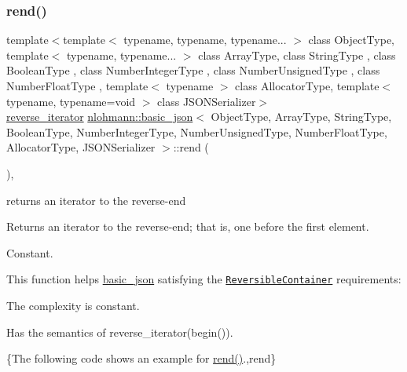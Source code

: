 \subsubsection{\texorpdfstring{rend()}{rend()}\hspace{0.1cm}{\footnotesize\ttfamily [1/2]}}
{\footnotesize\ttfamily template$<$template$<$ typename, typename, typename... $>$ class Object\+Type, template$<$ typename, typename... $>$ class Array\+Type, class String\+Type , class Boolean\+Type , class Number\+Integer\+Type , class Number\+Unsigned\+Type , class Number\+Float\+Type , template$<$ typename $>$ class Allocator\+Type, template$<$ typename, typename=void $>$ class J\+S\+O\+N\+Serializer$>$ \\
\hyperlink{classnlohmann_1_1basic__json_ac223d5560c2b05a208c88de67376c5f2}{reverse\+\_\+iterator} \hyperlink{classnlohmann_1_1basic__json}{nlohmann\+::basic\+\_\+json}$<$ Object\+Type, Array\+Type, String\+Type, Boolean\+Type, Number\+Integer\+Type, Number\+Unsigned\+Type, Number\+Float\+Type, Allocator\+Type, J\+S\+O\+N\+Serializer $>$\+::rend (\begin{DoxyParamCaption}{ }\end{DoxyParamCaption})\hspace{0.3cm}{\ttfamily [inline]}, {\ttfamily [noexcept]}}



returns an iterator to the reverse-\/end 

Returns an iterator to the reverse-\/end; that is, one before the first element.

  Constant.

This function helps {\ttfamily \hyperlink{classnlohmann_1_1basic__json}{basic\+\_\+json}} satisfying the \href{http://en.cppreference.com/w/cpp/concept/ReversibleContainer}{\tt Reversible\+Container} requirements\+:
\begin{DoxyItemize}
\item The complexity is constant.
\item Has the semantics of {\ttfamily reverse\+\_\+iterator(begin())}.
\end{DoxyItemize}

\{The following code shows an example for {\ttfamily \hyperlink{classnlohmann_1_1basic__json_ac77aed0925d447744676725ab0b6d535}{rend()}}.,rend\}

